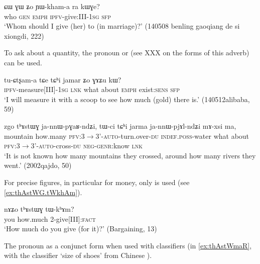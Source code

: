  
\begin{exe}
\ex  \label{ex:CW.GW}
\gll  ɕɯ ɣɯ ʑo ɲɯ-kham-a ra kɯɣe?    \\
who \textsc{gen} \textsc{emph} \textsc{ipfv}-give:III-\textsc{1sg} \textsc{sfp} \\
\glt `Whom should I give (her) to (in marriage)?' (140508 benling gaoqiang de si xiongdi, 222)
\end{exe}  


To ask about a quantity, the pronoun  or  (see XXX on the forms of this adverb) can be used.

\begin{exe}
\ex
\gll tu-ɕtʂam-a tɕe tɕʰi jamar ʑo ɣɤʑu kɯ? \\
\textsc{ipfv}-measure[III]-\textsc{1sg} \textsc{lnk} what about \textsc{emph} exist:\textsc{sens} \textsc{sfp} \\
\glt `I will measure it with a scoop to see how much (gold) there is.' (140512alibaba, 59)
\end{exe}  

\begin{exe}
\ex
\gll  zgo 	tʰɤstɯɣ 	ja-nnɯ-pɣaʁ-ndʑi, 	tɯ-ci 	tɕʰi 	jarma 	ja-nnɯ-pjɤl-ndʑi 	mɤ-xsi 	ma,       \\
 mountain how.many \textsc{pfv}:3$\rightarrow$3'-\textsc{auto}-turn.over-\textsc{du} \textsc{indef.poss}-water what about \textsc{pfv}:3$\rightarrow$3'-\textsc{auto}-cross-\textsc{du} \textsc{neg-genr}:know \textsc{lnk} \\
\glt `It is not known how many mountains they crossed, around how many rivers they went.'  (2002qajdo, 50)
\end{exe}  
  
  
For precise figures, in particular for money, only  is used (see \ref{ex:thAstWG.tWkhAm}).
\begin{exe}
\ex \label{ex:thAstWG.tWkhAm}
 \gll    nɤʑo 	tʰɤstɯɣ 	tɯ-kʰɤm?    \\
 you how.much 2-give[III]:\textsc{fact}  \\
\glt  `How much do you give (for it)?' (Bargaining, 13)
\end{exe} 

The pronoun  as a conjunct form  when used with classifiers (in \ref{ex:thAstWmaR}, with the classifier  `size of shoes' from Chinese  ).

